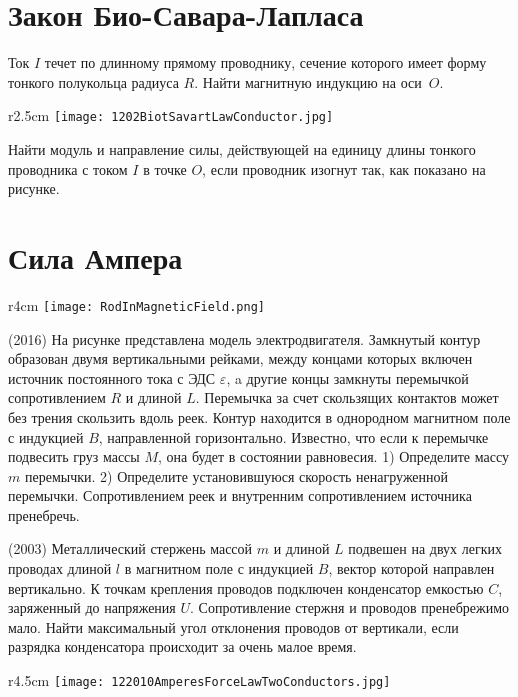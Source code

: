 \section{Закон Био-Савара-Лапласа}

\AddProb Ток $I$ течет по длинному прямому проводнику, сечение которого имеет форму тонкого полукольца радиуса $R$. Найти магнитную индукцию на оси~$O$.

\begin{wrapfigure}{r}{2.5cm}
\texttt{[image: 1202BiotSavartLawConductor.jpg]}
\end{wrapfigure}

\AddProb Найти модуль и направление силы, действующей на единицу длины тонкого проводника с током $I$ в точке $O$, 
если проводник изогнут так, как показано на рисунке.


\section{Сила Ампера}

\begin{wrapfigure}{r}{4cm}
\texttt{[image: RodInMagneticField.png]}
\end{wrapfigure}
\AddProb (2016) На рисунке представлена модель электродвигателя. Замкнутый контур образован двумя вертикальными рейками, между концами которых включен источник постоянного тока с ЭДС {\Large $\varepsilon$}, a другие концы замкнуты перемычкой сопротивлением $R$ и длиной $L$. Перемычка за счет скользящих контактов может без трения скользить вдоль реек. Контур находится в однородном магнитном поле с индукцией $B$, направленной горизонтально. Известно, что если к перемычке подвесить груз массы $M$, она будет в состоянии равновесия. 1) Определите массу $m$ перемычки. 2) Определите установившуюся скорость ненагруженной перемычки. Сопротивлением реек и внутренним сопротивлением источника пренебречь.

\AddProb (2003) Металлический стержень массой $m$ и длиной $L$ подвешен на двух легких проводах длиной $l$ в магнитном поле с индукцией $B$, 
вектор которой направлен вертикально. К точкам крепления проводов подключен конденсатор емкостью $C$, заряженный до напряжения $U$. 
Сопротивление стержня и проводов пренебрежимо мало. Найти максимальный угол отклонения проводов от вертикали, 
если разрядка конденсатора происходит за очень малое время.

\begin{wrapfigure}{r}{4.5cm}
\texttt{[image: 122010AmperesForceLawTwoConductors.jpg]}
\end{wrapfigure}


